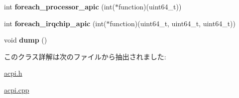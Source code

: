 \begin{DoxyCompactItemize}
\item 
\hypertarget{classacpi__apic_a54cec0a38788cb5df1544ad5ed412e8c}{}int {\bfseries foreach\+\_\+processor\+\_\+apic} (int($\ast$function)(uint64\+\_\+t))\label{classacpi__apic_a54cec0a38788cb5df1544ad5ed412e8c}

\item 
\hypertarget{classacpi__apic_a5790b7de6edd98af4e499e048dda62a4}{}int {\bfseries foreach\+\_\+irqchip\+\_\+apic} (int($\ast$function)(uint64\+\_\+t, uint64\+\_\+t, uint64\+\_\+t))\label{classacpi__apic_a5790b7de6edd98af4e499e048dda62a4}

\item 
\hypertarget{classacpi__apic_a91ad1b58ee35b7efaee43b00c1816877}{}void {\bfseries dump} ()\label{classacpi__apic_a91ad1b58ee35b7efaee43b00c1816877}

\end{DoxyCompactItemize}


このクラス詳解は次のファイルから抽出されました\+:\begin{DoxyCompactItemize}
\item 
\hyperlink{acpi_8h}{acpi.\+h}\item 
\hyperlink{acpi_8cpp}{acpi.\+cpp}\end{DoxyCompactItemize}

